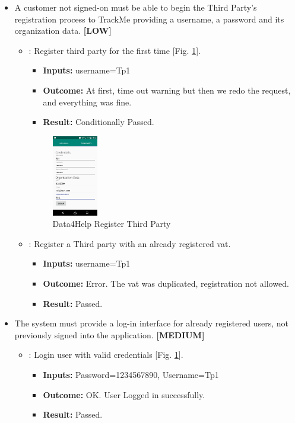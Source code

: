 \documentclass[a4paper, hidelinks, 12pt]{report}
\newcommand\requirement[1]{\item[{[REQ-#1]}] }
\newcommand\test[1]{\item[{[TEST-#1]}] }
\begin{document}
\begin{itemize}
		\requirement{2} A customer not signed-on must be able to begin the Third Party’s registration process to TrackMe providing a username, a password and its organization data. \textbf{[LOW]}
		\begin{itemize}
		\test{3}: Register third party for the first time [Fig. \ref{fig:register_third_party}].
			\begin{itemize}
			\item \textbf{Inputs: } username=Tp1			
			\item \textbf{Outcome: } At first, time out warning but then we redo the request, and everything was fine.
			\item \textbf{Result: } Conditionally Passed. 
			\end{itemize}
			
		\begin{figure}[H]
					\centering
				\includegraphics[width=0.2\textwidth]{images/register_third_party.jpeg}
					\caption[Data4Help Register Third Party]{Data4Help Register Third Party}
				\label{fig:register_third_party}
			\end{figure}
			
		\test{4}: Register a Third party with an already registered vat.
			\begin{itemize}
			\item \textbf{Inputs: } username=Tp1
			\item \textbf{Outcome: } Error. The vat was duplicated, registration not allowed.
			\item \textbf{Result: } Passed. 
			 \end{itemize}	
	\end{itemize}
	
\requirement{3}The system must provide a log-in interface for already registered users, not previously signed into the application. \textbf{[MEDIUM]}
		\begin{itemize}
		\test{5}: Login user with valid credentials [Fig. \ref{fig:register_third_party}].
			\begin{itemize}
			\item \textbf{Inputs: }Password=1234567890, Username=Tp1			
			\item \textbf{Outcome: } OK. User Logged in successfully.
			\item \textbf{Result: } Passed. 
			\end{itemize}
			

\end{itemize}
\end{itemize}
\end{document}
